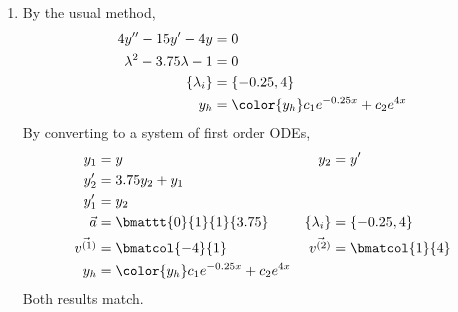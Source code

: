 \begin{enumerate}
    \item By the usual method,
          \begin{align}
              4y'' - 15y' - 4y              & = 0                                       \\
              \lambda^{2} - 3.75\lambda - 1 & = 0                                       \\
              \{\lambda_i\}                 & = \{-0.25, 4\}                            \\
              y_h                           & = \color{y_h} c_1 e^{-0.25x} + c_2 e^{4x}
          \end{align}
          By converting to a system of first order ODEs,
          \begin{align}
              y_1           & = y                                       & y_2           & = y'             \\
              y_2'          & = 3.75y_2 + y_1                                                              \\
              y_1'          & = y_2                                                                        \\
              \vec{a}       & = \bmattt{0}{1}{1}{3.75}                  & \{\lambda_i\} & = \{-0.25, 4\}   \\
              \vec{v^{(1)}} & = \bmatcol{-4}{1}                         & \vec{v^{(2)}} & = \bmatcol{1}{4} \\
              y_h           & = \color{y_h} c_1 e^{-0.25x} + c_2 e^{4x}
          \end{align}
          Both results match.


\end{enumerate}
